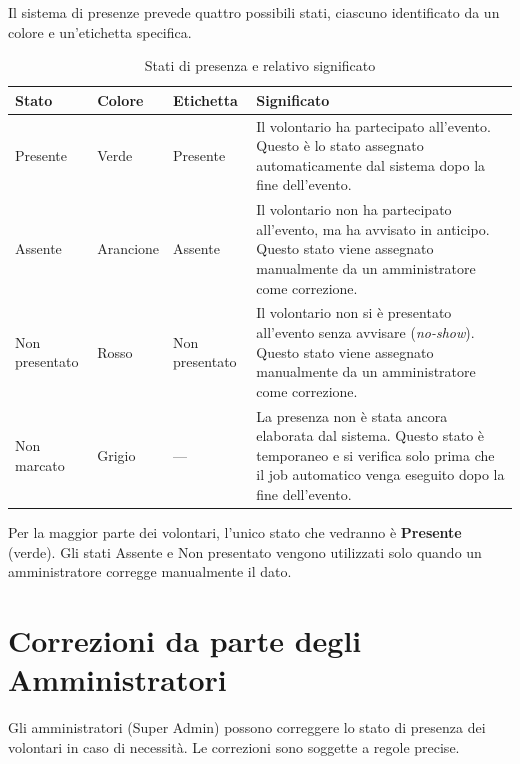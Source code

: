 \documentclass[a4paper,11pt,oneside]{book}
\begin{document}
Il sistema di presenze prevede quattro possibili stati, ciascuno identificato da un colore e un'etichetta specifica.

\begin{table}[htbp]
\centering
\caption{Stati di presenza e relativo significato}
\label{tab:stati-presenza}
\begin{tabularx}{\textwidth}{l l l X}
\toprule
\textbf{Stato} & \textbf{Colore} & \textbf{Etichetta} & \textbf{Significato} \\
\midrule
Presente       & \textcolor{namoGreen}{Verde}     & Presente         & Il volontario ha partecipato all'evento. Questo \`e lo stato assegnato automaticamente dal sistema dopo la fine dell'evento. \\[6pt]
Assente        & \textcolor{namoOrange}{Arancione} & Assente          & Il volontario non ha partecipato all'evento, ma ha avvisato in anticipo. Questo stato viene assegnato manualmente da un amministratore come correzione. \\[6pt]
Non presentato & \textcolor{namoRed}{Rosso}        & Non presentato   & Il volontario non si \`e presentato all'evento senza avvisare (\textit{no-show}). Questo stato viene assegnato manualmente da un amministratore come correzione. \\[6pt]
Non marcato    & Grigio                            & ---              & La presenza non \`e stata ancora elaborata dal sistema. Questo stato \`e temporaneo e si verifica solo prima che il job automatico venga eseguito dopo la fine dell'evento. \\
\bottomrule
\end{tabularx}
\end{table}

\begin{tipbox}
Per la maggior parte dei volontari, l'unico stato che vedranno \`e \textcolor{namoGreen}{\textbf{Presente}} (verde). Gli stati \textcolor{namoOrange}{Assente} e \textcolor{namoRed}{Non presentato} vengono utilizzati solo quando un amministratore corregge manualmente il dato.
\end{tipbox}

\section{Correzioni da parte degli Amministratori}
\label{sec:correzioni-amministratori}

Gli amministratori (Super Admin) possono correggere lo stato di presenza dei volontari in caso di necessit\`a. Le correzioni sono soggette a regole precise.
\end{document}
